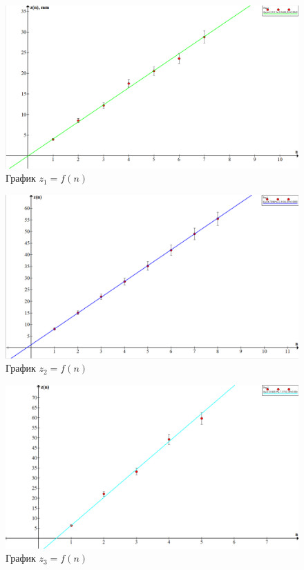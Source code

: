 \begin{figure}[h!]
  \centering
  \includegraphics[width=13cm]{pics/lab_436_1.png}
  \caption{График $z_1 = f(n)$}
  \label{}
\end{figure}

\begin{figure}[h!]
  \centering
  \includegraphics[width=13cm]{pics/lab_436_2.png}
  \caption{График $z_2 = f(n)$}
  \label{}
\end{figure}


\begin{figure}[h!]
  \centering
  \includegraphics[width=13cm]{pics/lab_436_3.png}
  \caption{График $z_3 = f(n)$}
  \label{}
\end{figure}


